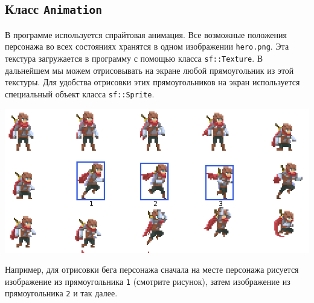 \documentclass{article}
\begin{document}
\subsection*{Класс \texttt{Animation}}
В программе используется спрайтовая анимация. Все возможные положения персонажа во всех состояниях хранятся в одном изображении \texttt{hero.png}. Эта текстура загружается в программу с помощью класса \texttt{sf::Texture}. В дальнейшем мы можем отрисовывать на экране любой прямоугольник из этой текстуры. Для удобства отрисовки этих прямоугольников на экран используется специальный объект класса \texttt{sf::Sprite}.
\begin{center}
\includegraphics[scale=0.3]{../images/hero_texture_rects.png}
\end{center}
Например, для отрисовки бега персонажа сначала на месте персонажа рисуется изображение из прямоугольника \texttt{1} (смотрите рисунок), затем изображение из прямоугольника \texttt{2} и так далее.\\
\end{document}
